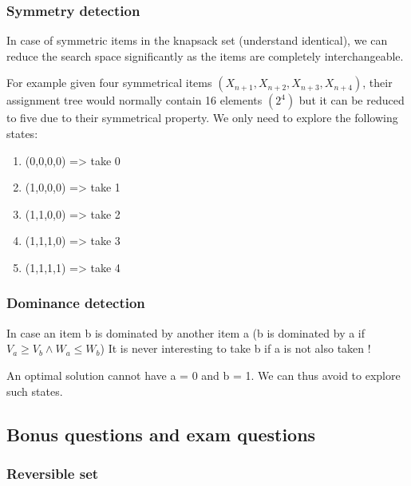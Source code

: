\subsubsection{Symmetry detection}

In case of symmetric items in the knapsack set (understand identical), we can reduce the
search space significantly as the items are completely interchangeable.\newline

For example given four symmetrical items $(X_{n+1}, X_{n+2}, X_{n+3}, X_{n+4})$, 
their assignment tree would normally contain 16 elements $(2^4)$ but it can 
be reduced to five due to their symmetrical property. 
We only need to explore the following states:

\begin{enumerate}
	\item (0,0,0,0) => take 0
	\item (1,0,0,0) => take 1
	\item (1,1,0,0) => take 2
	\item (1,1,1,0) => take 3
	\item (1,1,1,1) => take 4
\end{enumerate}

\subsubsection{Dominance detection}

In case an item b is dominated by another item a
(b is dominated by a if $V_a \geq V_b \wedge W_a \leq W_b$)
It is never interesting to take b if a is not also taken ! \newline

An optimal solution cannot have a = 0 and b = 1. 
We can thus avoid to explore such states.

\subsection{Bonus questions and exam questions}

\subsubsection{Reversible set}

